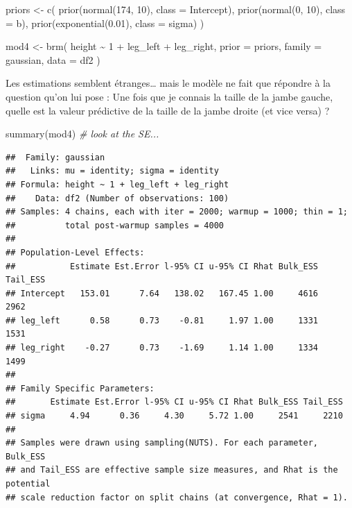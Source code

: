 \documentclass[
  a4paper,11pt,twoside,onecolumn,openright,final,oldfontcommands]{memoir}
\newenvironment{Shaded}{\begin{snugshade}}{\end{snugshade}}
\newcommand{\AttributeTok}[1]{\textcolor[rgb]{0.77,0.63,0.00}{#1}}
\newcommand{\CommentTok}[1]{\textcolor[rgb]{0.56,0.35,0.01}{\textit{#1}}}
\newcommand{\DecValTok}[1]{\textcolor[rgb]{0.00,0.00,0.81}{#1}}
\newcommand{\FloatTok}[1]{\textcolor[rgb]{0.00,0.00,0.81}{#1}}
\newcommand{\FunctionTok}[1]{\textcolor[rgb]{0.00,0.00,0.00}{#1}}
\newcommand{\NormalTok}[1]{#1}
\newcommand{\OtherTok}[1]{\textcolor[rgb]{0.56,0.35,0.01}{#1}}
\newcommand{\SpecialCharTok}[1]{\textcolor[rgb]{0.00,0.00,0.00}{#1}}
\theoremstyle{definition}
\theoremstyle{definition}
\theoremstyle{definition}
\theoremstyle{remark}
\begin{document}
\begin{Shaded}
\begin{Highlighting}[]
\NormalTok{priors }\OtherTok{\textless{}{-}} \FunctionTok{c}\NormalTok{(}
  \FunctionTok{prior}\NormalTok{(}\FunctionTok{normal}\NormalTok{(}\DecValTok{174}\NormalTok{, }\DecValTok{10}\NormalTok{), }\AttributeTok{class =}\NormalTok{ Intercept),}
  \FunctionTok{prior}\NormalTok{(}\FunctionTok{normal}\NormalTok{(}\DecValTok{0}\NormalTok{, }\DecValTok{10}\NormalTok{), }\AttributeTok{class =}\NormalTok{ b),}
  \FunctionTok{prior}\NormalTok{(}\FunctionTok{exponential}\NormalTok{(}\FloatTok{0.01}\NormalTok{), }\AttributeTok{class =}\NormalTok{ sigma)}
\NormalTok{  )}

\NormalTok{mod4 }\OtherTok{\textless{}{-}} \FunctionTok{brm}\NormalTok{(}
\NormalTok{  height }\SpecialCharTok{\textasciitilde{}} \DecValTok{1} \SpecialCharTok{+}\NormalTok{ leg\_left }\SpecialCharTok{+}\NormalTok{ leg\_right,}
  \AttributeTok{prior =}\NormalTok{ priors,}
  \AttributeTok{family =}\NormalTok{ gaussian,}
  \AttributeTok{data =}\NormalTok{ df2}
\NormalTok{  )}
\end{Highlighting}
\end{Shaded}

Les estimations semblent étranges\ldots{} mais le modèle ne fait que répondre à la question qu'on lui pose : Une fois que je connais la taille de la jambe gauche, quelle est la valeur prédictive de la taille de la jambe droite (et vice versa) ?

\begin{Shaded}
\begin{Highlighting}[]
\FunctionTok{summary}\NormalTok{(mod4) }\CommentTok{\# look at the SE...}
\end{Highlighting}
\end{Shaded}

\begin{verbatim}
##  Family: gaussian 
##   Links: mu = identity; sigma = identity 
## Formula: height ~ 1 + leg_left + leg_right 
##    Data: df2 (Number of observations: 100) 
## Samples: 4 chains, each with iter = 2000; warmup = 1000; thin = 1;
##          total post-warmup samples = 4000
## 
## Population-Level Effects: 
##           Estimate Est.Error l-95% CI u-95% CI Rhat Bulk_ESS Tail_ESS
## Intercept   153.01      7.64   138.02   167.45 1.00     4616     2962
## leg_left      0.58      0.73    -0.81     1.97 1.00     1331     1531
## leg_right    -0.27      0.73    -1.69     1.14 1.00     1334     1499
## 
## Family Specific Parameters: 
##       Estimate Est.Error l-95% CI u-95% CI Rhat Bulk_ESS Tail_ESS
## sigma     4.94      0.36     4.30     5.72 1.00     2541     2210
## 
## Samples were drawn using sampling(NUTS). For each parameter, Bulk_ESS
## and Tail_ESS are effective sample size measures, and Rhat is the potential
## scale reduction factor on split chains (at convergence, Rhat = 1).
\end{verbatim}
\end{document}
